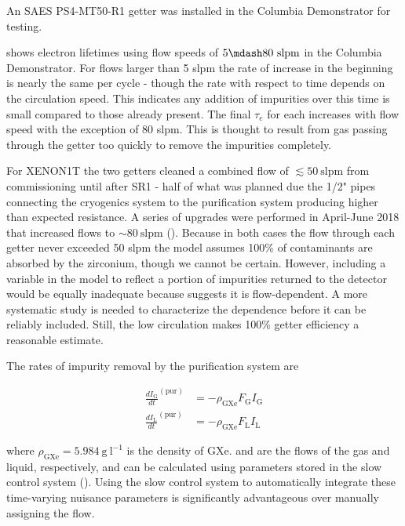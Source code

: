 An SAES PS4-MT50-R1 getter was installed in the Columbia Demonstrator for testing.

 shows electron lifetimes using flow speeds of $5 \mdash 80\ \mathrm{slpm}$
in the Columbia Demonstrator.  For flows larger than 5 slpm the rate of increase in the beginning is nearly the same per cycle - though
the rate with respect to time depends on the circulation speed.  This indicates any addition of impurities over this time is small
compared to those already present.  The final $\tau_e$ for each increases with flow speed with the exception of 80 slpm.  This is thought
to result from gas passing through the getter too quickly to remove the impurities completely.

For XENON1T the two getters cleaned a combined flow of $\lesssim 50\ \mathrm{slpm}$ from commissioning until after SR1 - half of what was
planned due the 1/2" pipes connecting the cryogenics system to the purification system producing higher than expected resistance.  A
series of
upgrades were performed in April-June 2018 that increased flows to ${\sim} 80\ \mathrm{slpm}$ (\secref{}).  Because in both cases the
flow through each getter never exceeded 50 slpm the model assumes 100\% of contaminants are absorbed by the zirconium, though we cannot
be certain.  However, including a variable in the model to reflect a portion of impurities returned
to the detector would be equally inadequate because  suggests it is
flow-dependent.  A more systematic study is needed to characterize the dependence before it can be reliably included.  Still, the low
circulation makes 100\% getter efficiency a reasonable estimate.

The rates of impurity removal by the purification system are

\begin{equation}
\begin{aligned}
\frac{dI_{\mathrm{G}}}{dt}^{(\mathrm{pur})} &= -\rho_{\mathrm{GXe}} F_{\mathrm{G}} I_{\mathrm{G}}
\label{eq:electron_lifetime_model_removal_gxe}
\\
\frac{dI_{\mathrm{L}}}{dt}^{(\mathrm{pur})} &= -\rho_{\mathrm{GXe}} F_{\mathrm{L}} I_{\mathrm{L}}
\label{eq:electron_lifetime_model_removal_lxe}
\end{aligned}
\end{equation}

\noindent where $\rho_{\mathrm{GXe}} = 5.984\ \mathrm{g\ l^{-1}}$ is the density of GXe.  \fg and \fl are the flows of the
gas and liquid, respectively, and can be calculated using parameters stored in the slow control system
().  Using the slow control system to automatically integrate these time-varying nuisance
parameters is significantly advantageous over manually assigning the flow.

